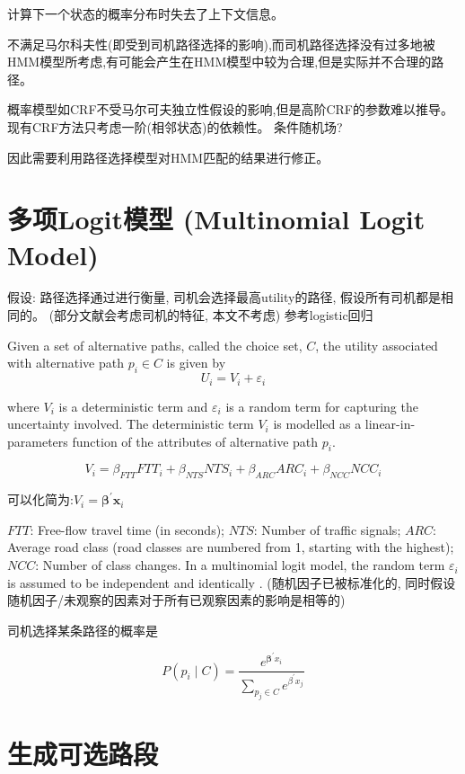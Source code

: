 \label{Problem:PureHMM1}

计算下一个状态的概率分布时失去了上下文信息。

不满足马尔科夫性(即受到司机路径选择的影响),而司机路径选择没有过多地被HMM模型所考虑,有可能会产生在HMM模型中较为合理,但是实际并不合理的路径。

概率模型如CRF不受马尔可夫独立性假设的影响,但是高阶CRF的参数难以推导。 现有CRF方法只考虑一阶(相邻状态)的依赖性。 条件随机场?

因此需要利用路径选择模型对HMM匹配的结果进行修正。

\section{多项Logit模型 (Multinomial Logit Model)}

假设: 路径选择通过进行衡量, 司机会选择最高utility的路径, 假设所有司机都是相同的。 (部分文献会考虑司机的特征, 本文不考虑) 参考logistic回归

Given a set of alternative paths, called the choice set, $ C $, the utility associated with alternative path $ p_{i} \in C $ is given by
$$
U_{i}=V_{i}+\varepsilon_{i}
$$

where $ V_{i} $ is a deterministic term and $ \varepsilon_{i} $ is a random term for capturing the uncertainty involved. The deterministic term $ V_{i} $ is modelled as a linear-in-parameters function of the attributes of alternative path $ p_{i} $. 

$$ V_{i}=\beta_{F T T} F T T_{i}+\beta_{N T S} N T S_{i}+\beta_{A R C} A R C_{i}+\beta_{N C C} N C C_{i} $$

可以化简为:$ V_{i}=\boldsymbol{\beta}^{\prime} \boldsymbol{x}_{i} $

$FTT$: Free-flow travel time (in seconds); $N T S$: Number of traffic signals; $ARC$: Average road class (road classes are numbered from 1, starting with the highest); $NCC$: Number of class changes. In a multinomial logit model, the random term $ \varepsilon_{i} $ is assumed to be independent and identically . (随机因子已被标准化的, 同时假设随机因子/未观察的因素对于所有已观察因素的影响是相等的)

司机选择某条路径的概率是

$$ P\left(p_{i} \mid C\right)=\frac{e^{\boldsymbol{\beta}^{\prime} x_{i}}}{\sum_{p_{j} \in C} e^{\beta^{\prime} x_{j}}} $$

\section{生成可选路段}

